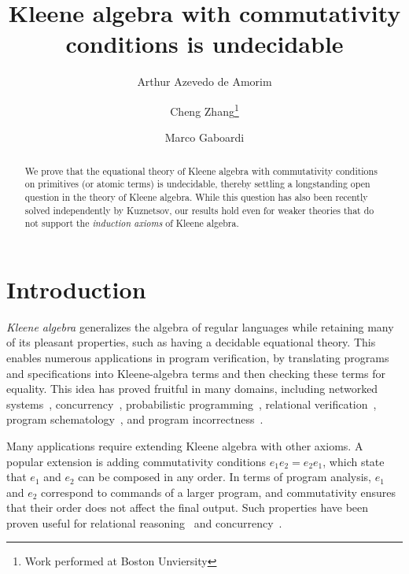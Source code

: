 \documentclass[a4paper,UKenglish,cleveref, autoref, thm-restate]{lipics-v2021}
\title{Kleene algebra with commutativity conditions is undecidable}
\author{Arthur Azevedo de Amorim}{Rochester Institute of Technology}{arthur.aa@gmail.com}{0000-0001-9916-6614}{National Science Foundation Grant No. 2314323.}
\author{Cheng Zhang\footnote{Work performed at Boston Unviersity}}{University College London}{czhang03@bu.edu}{https://orcid.org/0000-0002-8197-6181}{National Science Foundation Award No. 1845803 and No. 2040249.}
\author{Marco Gaboardi}{Boston University}{gaboardi@bu.edu}{0000-0002-5235-7066}{National Science Foundation Award No. 1845803 and No. 2040249.}
\begin{document}
 

\maketitle

\begin{abstract}
  We prove that the equational theory of Kleene algebra with commutativity
  conditions on primitives (or atomic terms) is undecidable, thereby settling a
  longstanding open question in the theory of Kleene algebra.  While this
  question has also been recently solved independently by Kuznetsov, our results
  hold even for weaker theories that do not support the \emph{induction axioms}
  of Kleene algebra.
\end{abstract}

\section{Introduction}

\emph{Kleene algebra} generalizes the algebra of regular languages while
retaining many of its pleasant properties, such as having a decidable equational
theory.  This enables numerous applications in program verification, by
translating programs and specifications into Kleene-algebra terms and then
checking these terms for equality.  This idea has proved fruitful in many
domains, including networked
systems~\cite{Anderson_Foster_Guha_Jeannin_Kozen_Schlesinger_Walker_2014,Foster_Kozen_Milano_Silva_Thompson_2015},
concurrency~\cite{Hoare_Möller_Struth_Wehrman_2009,Kappé_Brunet_Silva_Wagemaker_Zanasi_2020,Kappé_Brunet_Silva_Zanasi_2018},
probabilistic programming~\cite{McIver_Cohen_Morgan_2006,
  McIver_Rabehaja_Struth_2011}, relational
verification~\cite{Antonopoulos_Koskinen_Le_Nagasamudram_Naumann_Ngo_2022},
program schematology~\cite{Angus_Kozen_2001}, and program
incorrectness~\cite{Zhang_deAmorim_Gaboardi_2022}.

Many applications require extending Kleene algebra with other axioms.  A popular
extension is adding commutativity conditions $e_1e_2 = e_2e_1$, which state that
$e_1$ and $e_2$ can be composed in any order.  In terms of program analysis,
$e_1$ and $e_2$ correspond to commands of a larger program, and commutativity
ensures that their order does not affect the final output.  Such properties have
been proven useful for relational
reasoning~\cite{Antonopoulos_Koskinen_Le_Nagasamudram_Naumann_Ngo_2022} and
concurrency~\cite{diekert_PartialCommutationTraces_1997}.
\end{document}
